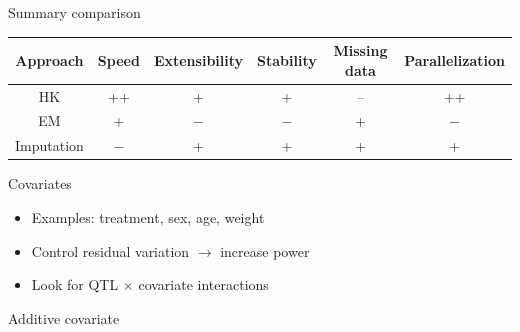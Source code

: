\documentclass[12pt]{article}
\newcommand{\headsize}{\fontsize{35}{35} \selectfont}
\newcommand{\smallsize}{\fontsize{25}{30} \selectfont}
\newcommand{\smallersize}{\fontsize{20}{25} \selectfont}
\begin{document}
\newpage

\headsize \color{myyellow}
\hfill \begin{minipage}{5.75in}
\centering
Summary comparison
\end{minipage}


\vspace{25mm}

\begin{center}
\color{mywhite}
\smallersize

\renewcommand\arraystretch{2}
\begin{tabular}{cccccc}
\hline
Approach & Speed & Extensibility & Stability & Missing data &
Parallelization \\
\hline
HK & ++ & + & + & -- & ++ \\
EM & + & $-$ & $-$ & + & $-$ \\
Imputation & $-$ & + & + & + & + \\
\hline
\end{tabular}
\end{center}


\newpage

\headsize \color{myyellow}
\hfill \begin{minipage}{5.75in}
\centering
Covariates
\end{minipage}

\smallsize \color{mywhite}

\vspace{25mm}

\hfill
\begin{minipage}{10in}
\begin{itemize}
\setlength{\itemsep}{24pt}
\item {\color{mypink} Examples}: treatment, sex, age, weight

\item Control residual variation {\color{mypink} $\rightarrow$}
  increase power

\item Look for QTL $\times$ covariate interactions
\end{itemize}
\end{minipage}

\newpage

\headsize \color{myyellow}
\hfill \begin{minipage}{5.75in}
\centering
Additive covariate
\end{minipage}
\end{document}
